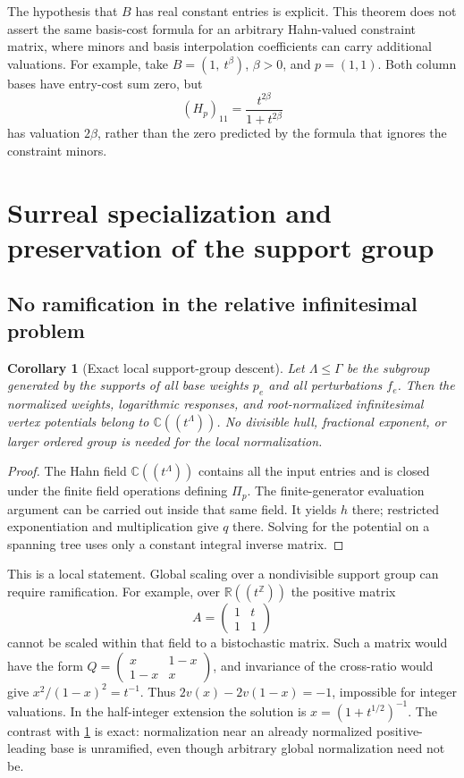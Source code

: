 \documentclass[11pt,a4paper]{article}
\numberwithin{equation}{section}
\newtheorem{corollary}[theorem]{Corollary}
\theoremstyle{definition}
\newcommand{\R}{\mathbb R}
\newcommand{\C}{\mathbb C}
\newcommand{\Z}{\mathbb Z}
\begin{document}
The hypothesis that $B$ has real constant entries is explicit.
This theorem does not assert the same basis-cost formula for an
arbitrary Hahn-valued constraint matrix, where minors and basis
interpolation coefficients can carry additional valuations. For example,
take $B=(1,\ t^\beta)$, $\beta>0$, and $p=(1,1)$. Both column bases
have entry-cost sum zero, but
\[
 (H_p)_{11}=\frac{t^{2\beta}}{1+t^{2\beta}}
\]
has valuation $2\beta$, rather than the zero predicted by the formula
that ignores the constraint minors.

\section{Surreal specialization and preservation of the support group}
\label{scale:sec:surreal}

\subsection{No ramification in the relative infinitesimal problem}
\begin{corollary}[Exact local support-group descent]
\label{scale:cor:descent}
Let $\Lambda\leq\Gamma$ be the subgroup generated by the supports
of all base weights $p_e$ and all perturbations $f_e$.
Then the normalized weights, logarithmic responses, and
root-normalized infinitesimal vertex potentials belong to
$\C((t^\Lambda))$. No divisible hull, fractional exponent, or
larger ordered group is needed for the local normalization.
\end{corollary}
\begin{proof}
The Hahn field $\C((t^\Lambda))$ contains all the input entries
and is closed under the finite field operations defining $\Pi_p$.
The finite-generator evaluation argument can be carried out inside
that same field. It yields $h$ there; restricted exponentiation and
multiplication give $q$ there. Solving for the potential on a
spanning tree uses only a constant integral inverse matrix.
\end{proof}
This is a local statement. Global scaling over a nondivisible
support group can require ramification. For example, over
$\R((t^\Z))$ the positive matrix
\begin{equation}\label{scale:eq:ramificationexample}
 A=\begin{pmatrix}1&t\\1&1\end{pmatrix}
\end{equation}
cannot be scaled within that field to a bistochastic matrix.
Such a matrix would have the form
$Q=\left(\begin{smallmatrix}x&1-x\\1-x&x\end{smallmatrix}\right)$,
and invariance of the cross-ratio would give
$x^2/(1-x)^2=t^{-1}$. Thus
$2v(x)-2v(1-x)=-1$, impossible for integer valuations.
In the half-integer extension the solution is
$x=(1+t^{1/2})^{-1}$.
The contrast with \cref{scale:cor:descent} is exact: normalization
near an already normalized positive-leading base is unramified,
even though arbitrary global normalization need not be.
\end{document}
